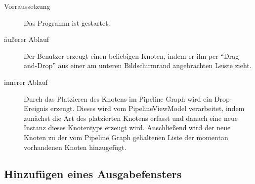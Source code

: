 \begin{description}
	\item[Vorraussetzung] Das Programm ist gestartet.
	\item[äußerer Ablauf] Der Benutzer erzeugt einen beliebigen Knoten, indem er ihn per ``Drag-and-Drop'' aus einer am unteren Bildschirmrand angebrachten Leiste zieht.
	\item[innerer Ablauf] Durch das Platzieren des Knotens im Pipeline Graph wird ein Drop-Ereignis erzeugt. Dieses wird vom PipelineViewModel verarbeitet, indem zunächst die Art des platzierten Knotens erfasst und danach eine neue Instanz dieses Knotentyps erzeugt wird. Anschließend wird der neue Knoten zu der vom Pipeline Graph gehaltenen Liste der momentan vorhandenen Knoten hinzugefügt.
\end{description}
\newpage
\subsection{Hinzufügen eines Ausgabefensters}
